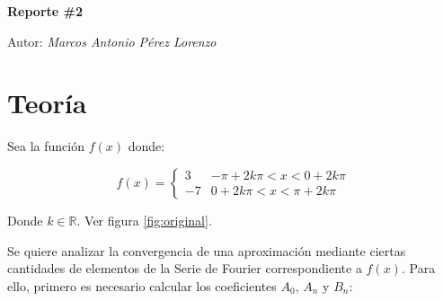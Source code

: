 \documentclass{article}[12pt,a4paper]
\begin{document}
\begin{titlepage}

  \centering
  {\huge\bfseries Reporte \#2\par}
	{\Large Autor: \itshape Marcos Antonio Pérez Lorenzo\par}
\end{titlepage}

\pagebreak

\section{Teoría}

Sea la función \(f(x)\) donde:

\begin{equation}
  f(x)=\begin{cases}
     3 & -\pi + 2k\pi < x < 0 + 2k\pi \\
    -7 & 0 + 2k\pi < x < \pi + 2k\pi
  \end{cases}
  \label{eq:fx}
\end{equation}

Donde \(k\in\mathbb{R}\). Ver figura \ref{fig:original}.

Se quiere analizar la convergencia de una aproximación mediante ciertas cantidades de elementos de la Serie de Fourier correspondiente a \(f(x)\). Para ello, primero es necesario calcular los coeficientes \(A_0\), \(A_n\) y \(B_n\):
\end{document}
